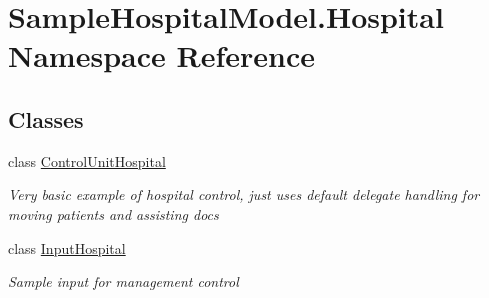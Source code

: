 \hypertarget{namespace_sample_hospital_model_1_1_hospital}{}\section{Sample\+Hospital\+Model.\+Hospital Namespace Reference}
\label{namespace_sample_hospital_model_1_1_hospital}
\subsection*{Classes}
\begin{DoxyCompactItemize}
\item 
class \hyperlink{class_sample_hospital_model_1_1_hospital_1_1_control_unit_hospital}{Control\+Unit\+Hospital}
\begin{DoxyCompactList}\small\item\em Very basic example of hospital control, just uses default delegate handling for moving patients and assisting docs \end{DoxyCompactList}\item 
class \hyperlink{class_sample_hospital_model_1_1_hospital_1_1_input_hospital}{Input\+Hospital}
\begin{DoxyCompactList}\small\item\em Sample input for management control \end{DoxyCompactList}\end{DoxyCompactItemize}
